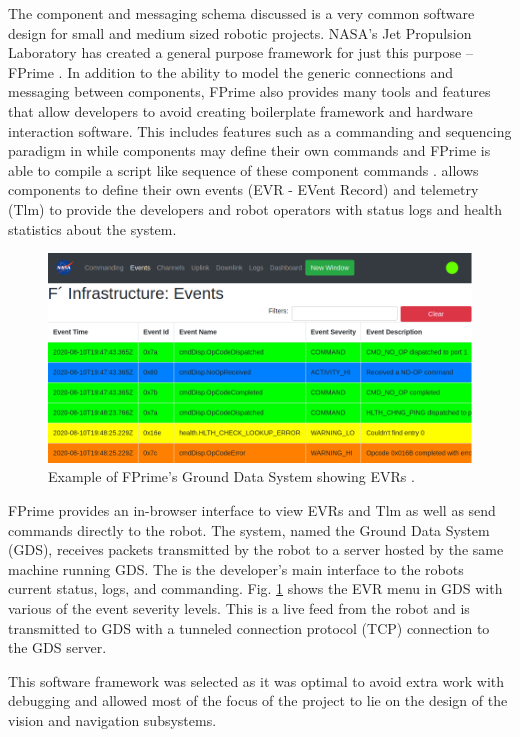 \documentclass{article}
\begin{document}
The component and messaging schema discussed is a very common software design for
small and medium sized robotic projects. NASA's Jet Propulsion Laboratory has
created a general purpose framework for just this purpose -- FPrime \cite{b4}.
In addition to the ability to model the generic connections and messaging between
components, FPrime also provides many tools and features that allow developers to
avoid creating boilerplate framework and hardware interaction software. This includes
features such as a commanding and sequencing paradigm in while components may define
their own commands and FPrime is able to compile a script like sequence of these
component commands \cite{b4}. \cite{b4} allows components to define their
own events (EVR - EVent Record) and telemetry (Tlm) to provide the developers and
robot operators with status logs and health statistics about the system.

\begin{figure}[htb]
	\centering
	\centerline{\includegraphics[width=1.0\linewidth]{gds}}
	\caption{Example of FPrime's Ground Data System showing EVRs \cite{b5}.}
	\label{fig:gds}
\end{figure}

FPrime provides an in-browser interface to view EVRs and Tlm as well as send commands
directly to the robot. The system, named the Ground Data System (GDS), receives
packets transmitted by the robot to a server hosted by the same machine running GDS.
The is the developer's main interface to the robots current status, logs, and
commanding. Fig. \ref{fig:gds} shows the EVR menu in GDS with various of the event
severity levels. This is a live feed from the robot and is transmitted to GDS with
a tunneled connection protocol (TCP) connection to the GDS server.

This software framework was selected as it was optimal to avoid extra work with
debugging and allowed most of the focus of the project to lie on the design of the
vision and navigation subsystems.
\end{document}
